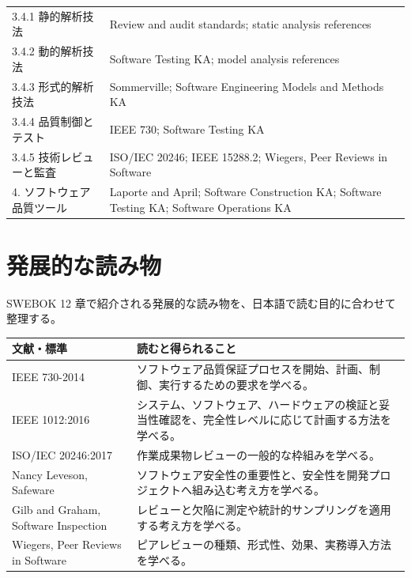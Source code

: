 \documentclass[11pt,a4paper]{article}
\begin{document}
{\begin{longtable}{L{0.45\textwidth}L{0.48\textwidth}}
3.4.1 静的解析技法 & Review and audit standards; static analysis references \\
3.4.2 動的解析技法 & Software Testing KA; model analysis references \\
3.4.3 形式的解析技法 & Sommerville; Software Engineering Models and Methods KA \\
3.4.4 品質制御とテスト & IEEE 730; Software Testing KA \\
3.4.5 技術レビューと監査 & ISO/IEC 20246; IEEE 15288.2; Wiegers, Peer Reviews in Software \\
4. ソフトウェア品質ツール & Laporte and April; Software Construction KA; Software Testing KA; Software Operations KA \\
\bottomrule
\end{longtable}}

\section{発展的な読み物}
SWEBOK 12 章で紹介される発展的な読み物を、日本語で読む目的に合わせて整理する。


\noindent\begin{tabularx}{\textwidth}{L{0.35\textwidth}Y}
\toprule
\textbf{文献・標準} & \textbf{読むと得られること} \\
\midrule
IEEE 730-2014 & ソフトウェア品質保証プロセスを開始、計画、制御、実行するための要求を学べる。 \\
IEEE 1012:2016 & システム、ソフトウェア、ハードウェアの検証と妥当性確認を、完全性レベルに応じて計画する方法を学べる。 \\
ISO/IEC 20246:2017 & 作業成果物レビューの一般的な枠組みを学べる。 \\
Nancy Leveson, Safeware & ソフトウェア安全性の重要性と、安全性を開発プロジェクトへ組み込む考え方を学べる。 \\
Gilb and Graham, Software Inspection & レビューと欠陥に測定や統計的サンプリングを適用する考え方を学べる。 \\
Wiegers, Peer Reviews in Software & ピアレビューの種類、形式性、効果、実務導入方法を学べる。 \\
\bottomrule
\end{tabularx}
\end{document}
